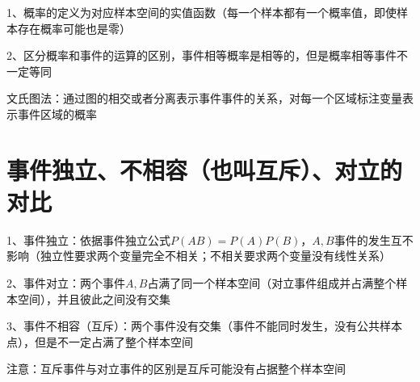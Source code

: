 1、概率的定义为对应样本空间的实值函数（每一个样本都有一个概率值，即使样本存在概率可能也是零）

2、区分概率和事件的运算的区别，事件相等概率是相等的，但是概率相等事件不一定等同

文氏图法：通过图的相交或者分离表示事件事件的关系，对每一个区域标注变量表示事件区域的概率



\section{事件独立、不相容（也叫互斥）、对立的对比}

1、事件独立：依据事件独立公式$ P(AB)=P(A)P(B) $，$ A,B $事件的发生互不影响（独立性要求两个变量完全不相关；不相关要求两个变量没有线性关系）

2、事件对立：两个事件$ A,B $占满了同一个样本空间（对立事件组成并占满整个样本空间），并且彼此之间没有交集

3、事件不相容（互斥）：两个事件没有交集（事件不能同时发生，没有公共样本点），但是不一定占满了整个样本空间

注意：互斥事件与对立事件的区别是互斥可能没有占据整个样本空间

